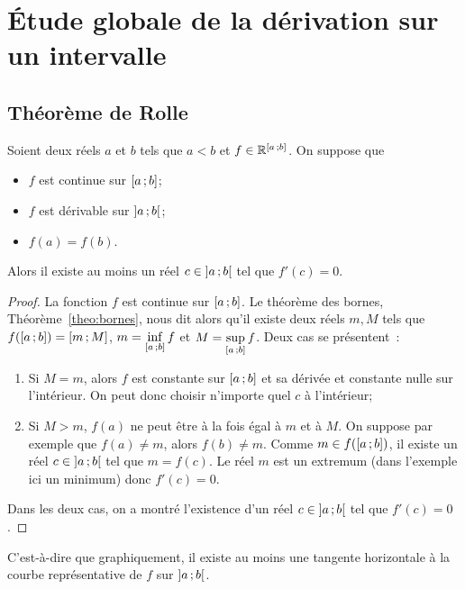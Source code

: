\section{Étude globale de la dérivation sur un intervalle}

\subsection{Théorème de Rolle}

\begin{theo}
  Soient deux réels \(a\) et \(b\) tels que \(a < b\) et \(f \in 
  \mathbb{R}^{\left[ a \, ; {} b \right]}\). On suppose que
  \begin{itemize}
    \item \(f\) est continue sur \(\left[ a \, ; {} b \right]\);
    \item \(f\) est dérivable sur \(\left] a \, ; {} b \right[\);
    \item \(f(a)=f(b)\).
  \end{itemize}
  Alors il existe au moins un réel \(c \in \left] a \, ; {} b \right[\) tel que 
  \(f'(c)=0\).
\end{theo}
\begin{proof}
  La fonction \(f\) est continue sur \(\left[ a \, ; {} b \right]\). Le théorème des 
  bornes, Théorème~\ref{theo:bornes}, nous dit alors qu'il existe deux réels
  \(m,M\) tels que 
  \(f(\left[ a \, ; {} b \right])=\left[ m \, ; {} M \right]\), \(m = 
  \inf\limits_{\left[ a \, ; {} b \right]} f\) et \(M = 
  \sup\limits_{\left[ a \, ; {} b \right]} f\). Deux cas se présentent~:
  \begin{enumerate}
    \item Si \(M=m\), alors \(f\) est constante sur \(\left[ a \, ; {} b \right]\) et 
      sa dérivée et constante nulle sur l'intérieur. On peut donc choisir 
      n'importe quel \(c\) à l'intérieur;
    \item Si \(M > m\), \(f(a)\) ne peut être à la fois égal à \(m\) et à \(M\). 
      On suppose par exemple que \(f(a) \neq m\), alors \(f(b) \neq m\). Comme 
      \(m \in f(\left[ a \, ; {} b \right])\), il existe un réel \(c \in 
      \left] a \, ; {} b \right[\) tel que \(m=f(c)\). Le réel \(m\) est un extremum 
      (dans l'exemple ici un minimum) donc \(f'(c)=0\).
  \end{enumerate}
  Dans les deux cas, on a montré l'existence d'un réel \(c \in 
  \left] a \, ; {} b \right[\) tel que \(f'(c)=0\).
\end{proof}

C'est-à-dire que graphiquement, il existe au moins une tangente horizontale à la 
courbe représentative de \(f\) sur \(\left] a \, ; {} b \right[\).

